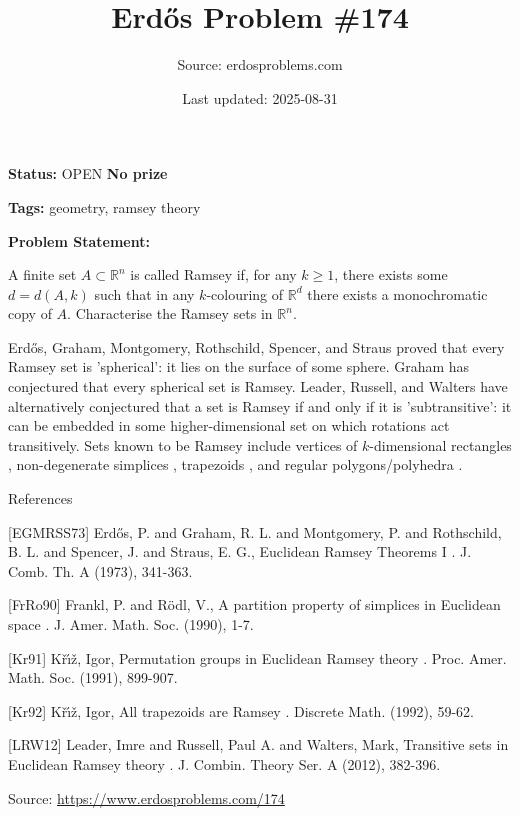 \documentclass{article}
\title{Erd\H{o}s Problem \#174}
\date{Last updated: 2025-08-31}
\author{Source: erdosproblems.com}
\begin{document}
\maketitle

\noindent\textbf{Status:} OPEN \quad \textbf{No prize}

\noindent\textbf{Tags:} geometry, ramsey theory

\medskip

\noindent\textbf{Problem Statement:}

A finite set $A\subset \mathbb{R}^n$ is called Ramsey if, for any $k\geq 1$, there exists some $d=d(A,k)$ such that in any $k$-colouring of $\mathbb{R}^d$ there exists a monochromatic copy of $A$. Characterise the Ramsey sets in $\mathbb{R}^n$.




Erd\H{o}s, Graham, Montgomery, Rothschild, Spencer, and Straus \cite{EGMRSS73} proved that every Ramsey set is 'spherical': it lies on the surface of some sphere. Graham has conjectured that every spherical set is Ramsey. Leader, Russell, and Walters \cite{LRW12} have alternatively conjectured that a set is Ramsey if and only if it is 'subtransitive': it can be embedded in some higher-dimensional set on which rotations act transitively. Sets known to be Ramsey include vertices of $k$-dimensional rectangles \cite{EGMRSS73}, non-degenerate simplices \cite{FrRo90}, trapezoids \cite{Kr92}, and regular polygons/polyhedra \cite{Kr91}.




References

[EGMRSS73] Erd\H{o}s, P. and Graham, R. L. and Montgomery, P. and Rothschild, B. L. and Spencer, J. and Straus, E. G., Euclidean Ramsey Theorems I . J. Comb. Th. A (1973), 341-363.

[FrRo90] Frankl, P. and R\"{o}dl, V., A partition property of simplices in Euclidean space . J. Amer. Math. Soc. (1990), 1-7.

[Kr91] K\v{r}\'{\i}\v{z}, Igor, Permutation groups in Euclidean Ramsey theory . Proc. Amer. Math. Soc. (1991), 899-907.

[Kr92] K\v{r}\'{\i}\v{z}, Igor, All trapezoids are Ramsey . Discrete Math. (1992), 59-62.

[LRW12] Leader, Imre and Russell, Paul A. and Walters, Mark, Transitive sets in Euclidean Ramsey theory . J. Combin. Theory Ser. A (2012), 382-396.


\bigskip
\noindent\small{Source: \url{https://www.erdosproblems.com/174}}
\end{document}
